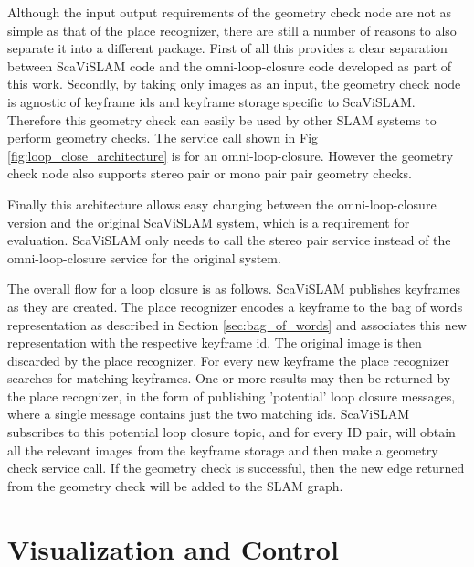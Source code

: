 Although the input output requirements of the geometry check node are not as simple as that of the place recognizer, there are still a number of reasons to also separate it into a different package.  First of all this provides a clear separation between ScaViSLAM code and the omni-loop-closure code developed as part of this work.  Secondly, by taking only images as an input, the geometry check node is agnostic of keyframe ids and keyframe storage specific to ScaViSLAM.  Therefore this geometry check can easily be used by other SLAM systems to perform geometry checks.  The service call shown in Fig \ref{fig:loop_close_architecture} is for an omni-loop-closure.  However the geometry check node also supports stereo pair or mono pair pair geometry checks.  

Finally this architecture allows easy changing between the omni-loop-closure version and the original ScaViSLAM system, which is a requirement for evaluation.  ScaViSLAM only needs to call the stereo pair service instead of the omni-loop-closure service for the original system.

The overall flow for a loop closure is as follows.  ScaViSLAM publishes keyframes as they are created.  The place recognizer encodes a keyframe to the bag of words representation as described in Section \ref{sec:bag_of_words} and associates this new representation with the respective keyframe id.  The original image is then discarded by the place recognizer.  For every new keyframe the place recognizer searches for matching keyframes.  One or more results may then be returned by the place recognizer, in the form of publishing 'potential' loop closure messages, where a single message contains just the two matching ids.  ScaViSLAM subscribes to this potential loop closure topic, and for every ID pair, will obtain all the relevant images from the keyframe storage and then make a geometry check service call.  If the geometry check is successful, then the new edge returned from the geometry check will be added to the SLAM graph.

\section{Visualization and Control}
\label{sec:visualization_and_control}

